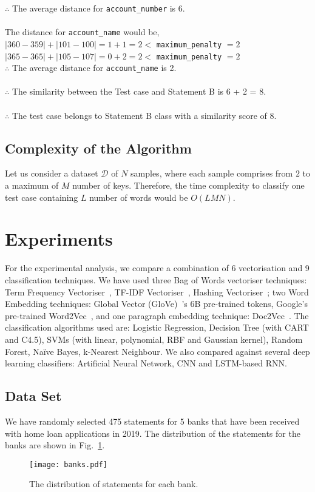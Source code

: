 \documentclass[runningheads]{llncs}
\begin{document}
\begin{example}
$\therefore$ The average distance for \texttt{account\_number} is 6.\\
\\
The distance for \texttt{account\_name} would be,\\
$| 360 - 359 | + | 101 - 100 | = 1 + 1  = 2 < $ \texttt{maximum\_penalty} $ = 2$\\
$| 365 - 365 | + | 105 - 107 | = 0 + 2  = 2 < $ \texttt{maximum\_penalty} $ = 2$\\
$\therefore$ The average distance for \texttt{account\_name} is 2.\\
\\
$\therefore$ The similarity between the Test case and Statement B is 6 + 2 = 8.\\
\\
$\therefore$ The test case belongs to Statement B class with a similarity score of 8.
\end{example}

\subsection{Complexity of the Algorithm}
Let us consider a dataset $\mathcal{D}$ of $N$ samples, where each sample comprises from $2$ to a maximum of $M$ number of keys. Therefore, the time complexity to classify one test case containing $L$ number of words would be $O(LMN)$.

\section{Experiments}\label{exp}
For the experimental analysis, we compare a combination of 6 vectorisation and 9 classification techniques. We have used three Bag of Words vectoriser techniques: Term Frequency Vectoriser~\cite{zhang2010}, TF-IDF Vectoriser~\cite{jones1972}, Hashing Vectoriser~\cite{hashing,scikit-learn}; two Word Embedding techniques: Global Vector (GloVe)~\cite{pennington2014}'s 6B pre-trained tokens, Google's pre-trained Word2Vec~\cite{mikolov2013}, and one paragraph embedding technique: Doc2Vec~\cite{le2014}. The classification algorithms used are: Logistic Regression, Decision Tree (with CART and C4.5), SVMs (with linear, polynomial, RBF and Gaussian kernel), Random Forest, Na\"ive Bayes, k-Nearest Neighbour. We also compared against several deep learning classifiers: Artificial Neural Network, CNN and LSTM-based RNN.

\subsection{Data Set}
We have randomly selected 475 statements for 5 banks that have been received with home loan applications in 2019. The distribution of the statements for the banks are shown in Fig.~\ref{banks}.
\begin{figure}
\texttt{[image: banks.pdf]}
\caption{The distribution of statements for each bank.} \label{banks}
\end{figure}
\end{document}
